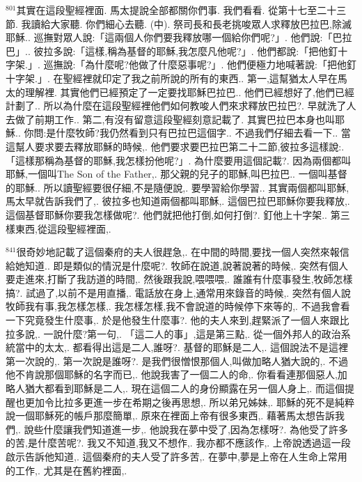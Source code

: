 \documentclass{book}
\begin{document}
$^{801}$其實在這段聖經裡面.
馬太提說全部都關你們事.
我們看看.
從第十七至二十三節.
我讀給大家聽.
你們細心去聽.
(中).
祭司長和長老挑唆眾人求釋放巴拉巴,除滅耶穌..
巡撫對眾人說:「這兩個人你們要我釋放哪一個給你們呢?」.
他們說:「巴拉巴」..
彼拉多說:「這樣,稱為基督的耶穌,我怎麼凡他呢?」.
他們都說:「把他釘十字架.」.
巡撫說:「為什麼呢?他做了什麼惡事呢?」.
他們便極力地喊著說:「把他釘十字架.」.
在聖經裡就印定了我之前所說的所有的東西..
第一,這幫猶太人早在馬太的理解裡.
其實他們已經預定了一定要找耶穌巴拉巴..
他們已經想好了,他們已經計劃了..
所以為什麼在這段聖經裡他們如何教唆人們來求釋放巴拉巴?.
早就洗了人去做了前期工作..
第二,有沒有留意這段聖經刻意記載了.
其實巴拉巴本身也叫耶穌..
你問:是什麼牧師?我仍然看到只有巴拉巴這個字..
不過我們仔細去看一下..
當這幫人要求要去釋放耶穌的時候,.
他們要求要巴拉巴第二十二節,彼拉多這樣說:.
「這樣那稱為基督的耶穌,我怎樣扮他呢?」.
為什麼要用這個記載?.
因為兩個都叫耶穌,一個叫The Son of the Father,.
那父親的兒子的耶穌,叫巴拉巴..
一個叫基督的耶穌..
所以讀聖經要很仔細,不是隨便說,.
要學習給你學習..
其實兩個都叫耶穌,馬太早就告訴我們了,.
彼拉多也知道兩個都叫耶穌,.
這個巴拉巴耶穌你要我釋放,.
這個基督耶穌你要我怎樣做呢?.
他們就把他打倒,如何打倒?.
釘他上十字架..
第三樣東西,從這段聖經裡面,.

$^{841}$很奇妙地記載了這個秦府的夫人很趕急,.
在中間的時間,要找一個人突然來報信給她知道..
即是類似的情況是什麼呢?.
牧師在說道,說著說著的時候,.
突然有個人要走進來,打斷了我訪道的時間,.
然後跟我說,喂喂喂,.
誰誰有什麼事發生,牧師怎樣搞?.
試過了,以前不是用直播,.
電話放在身上,通常用來錄音的時候,.
突然有個人說牧師我有事,我怎樣怎樣,.
我怎樣怎樣,我不會說道的時候停下來等的,.
不過我會看一下究竟發生什麼事,.
於是他發生什麼事?.
他的夫人來到,趕緊派了一個人來跟比拉多說,.
一說什麼?第一句,.
「這二人的事」,這是第三點,.
從一個外邦人的政治系統當中的太太,.
都看得出這是二人,誰呀?.
基督的耶穌是二人,.
這個說法不是這裡第一次說的,.
第一次說是誰呀?.
是我們很憎恨那個人,叫做加略人猶大說的,.
不過他不肯說那個耶穌的名字而已,.
他說我害了一個二人的命,.
你看看連那個惡人,加略人猶大都看到耶穌是二人,.
現在這個二人的身份顯露在另一個人身上,.
而這個提醒也更加令比拉多更進一步在希期之後再思想,.
所以弟兄姊妹,.
耶穌的死不是純粹說一個耶穌死的帳戶那麼簡單,.
原來在裡面上帝有很多東西,.
藉著馬太想告訴我們,.
說些什麼讓我們知道進一步,.
他說我在夢中受了,因為怎樣呀?.
為他受了許多的苦,是什麼苦呢?.
我又不知道,我又不想作,.
我亦都不應該作,.
上帝說透過這一段啟示告訴他知道,.
這個秦府的夫人受了許多苦,.
在夢中,夢是上帝在人生命上常用的工作,.
尤其是在舊約裡面,.
\end{document}
